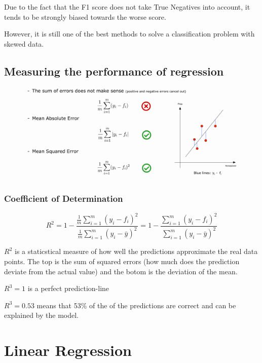 \documentclass[a4paper, 11pt]{article}
\begin{document}
Due to the fact that the F1 score does not take True Negatives into account, it tends to be strongly biased towards the worse score. 

However, it is still one of the best methods to solve a classification problem with skewed data.


\subsection{Measuring the performance of regression}

\begin{figure}[htb]
    \centering
    \includegraphics[keepaspectratio=true, width=\linewidth]{regression_error.png}
    \label{fig:regression_error}
\end{figure}

\subsubsection{Coefficient of Determination} \label{sec:r_squared}

\begin{equation}
	R^2 = 1- \frac{\frac{1}{m} \sum^{m}_{i=1}(y_{i} - f_{i})^2}{\frac{1}{m} \sum^{m}_{i=1}(y_{i} - \bar{y})^2} =1 - \frac{\sum^{m}_{i=1}(y_{i} - f_{i})^2}{\sum^{m}_{i=1}(y_{i} - \bar{y})^2} 
\end{equation}

$R^2$ is a staticstical measure of how well the predictions approximate the real data points. 
The top is the sum of squared errors (how much does the prediction deviate from the actual value) and the botom is the deviation of the mean.

$R^3 = 1$ is a perfect prediction-line

$R^3 = 0.53$ means that 53\% of the of the predictions are correct and can be explained by the model.

\newpage

\section{Linear Regression}
\end{document}
